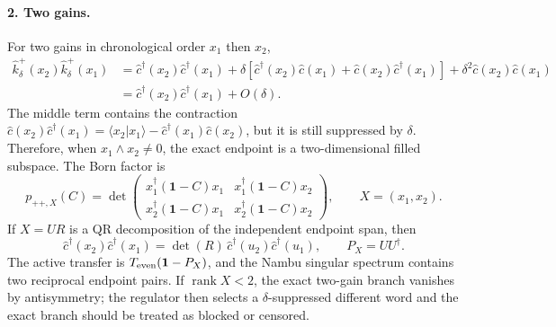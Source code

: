 \documentclass[aps,prb,onecolumn,nofootinbib,superscriptaddress]{revtex4-2}
\newcommand{\I}{\mathbf{1}}
\theoremstyle{plain}
\theoremstyle{definition}
\begin{document}
\paragraph*{2. Two gains.}
For two gains in chronological order \(x_1\) then \(x_2\),
\begin{align}
  \hat k_\delta^+(x_2)\hat k_\delta^+(x_1)
  &=
  \hat c^\dagger(x_2)\hat c^\dagger(x_1)
  +\delta\!\left[
    \hat c^\dagger(x_2)\hat c(x_1)
    +\hat c(x_2)\hat c^\dagger(x_1)
  \right]
  +\delta^2\hat c(x_2)\hat c(x_1)
  \nonumber\\
  &=
  \hat c^\dagger(x_2)\hat c^\dagger(x_1)
  +O(\delta).
  \label{eq:two-gain-regulated-expansion}
\end{align}
The middle term contains the contraction
\(\hat c(x_2)\hat c^\dagger(x_1)=
\langle x_2|x_1\rangle-\hat c^\dagger(x_1)\hat c(x_2)\), but it is still
suppressed by \(\delta\).  Therefore, when
\(x_1\wedge x_2\ne0\), the exact endpoint is a two-dimensional filled
subspace.  The Born factor is
\begin{equation}
  p_{++,X}(C)
  =
  \det
  \begin{pmatrix}
    x_1^\dagger(\I-C)x_1 & x_1^\dagger(\I-C)x_2\\
    x_2^\dagger(\I-C)x_1 & x_2^\dagger(\I-C)x_2
  \end{pmatrix},
  \qquad
  X=(x_1,x_2).
  \label{eq:two-gain-born-determinant}
\end{equation}
If \(X=UR\) is a QR decomposition of the independent endpoint span, then
\begin{equation}
  \hat c^\dagger(x_2)\hat c^\dagger(x_1)
  =
  \det(R)\,
  \hat c^\dagger(u_2)\hat c^\dagger(u_1),
  \qquad
  P_X=UU^\dagger .
  \label{eq:two-gain-qr-limit}
\end{equation}
The active transfer is \(T_{\rm even}(\I-P_X)\), and the Nambu singular
spectrum contains two reciprocal endpoint pairs.  If
\(\operatorname{rank}X<2\), the exact two-gain branch vanishes by
antisymmetry; the regulator then selects a \(\delta\)-suppressed different
word and the exact branch should be treated as blocked or censored.
\end{document}

